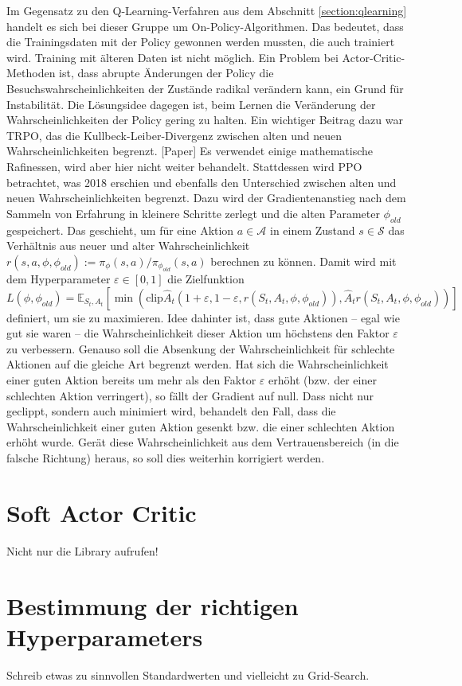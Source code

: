 Im Gegensatz zu den Q-Learning-Verfahren aus dem Abschnitt \ref{section:qlearning} handelt es sich bei dieser Gruppe um On-Policy-Algorithmen.
Das bedeutet, dass die Trainingsdaten mit der Policy gewonnen werden mussten, die auch trainiert wird.
Training mit älteren Daten ist nicht möglich.
Ein Problem bei Actor-Critic-Methoden ist, dass abrupte Änderungen der Policy die Besuchswahrscheinlichkeiten der Zustände radikal verändern kann, ein Grund für Instabilität.
Die Lösungsidee dagegen ist, beim Lernen die Veränderung der Wahrscheinlichkeiten der Policy gering zu halten.
Ein wichtiger Beitrag dazu war TRPO, das die Kullbeck-Leiber-Divergenz zwischen alten und neuen Wahrscheinlichkeiten begrenzt. [Paper]
Es verwendet einige mathematische Rafinessen, wird aber hier nicht weiter behandelt.
Stattdessen wird PPO betrachtet, was 2018 erschien und ebenfalls den Unterschied zwischen alten und neuen Wahrscheinlichkeiten begrenzt.
Dazu wird der Gradientenanstieg nach dem Sammeln von Erfahrung in kleinere Schritte zerlegt und die alten Parameter $\phi_{old}$ gespeichert.
Das geschieht, um für eine Aktion $a \in \mathcal{A}$ in einem Zustand $s \in \mathcal{S}$ das Verhältnis aus neuer und alter Wahrscheinlichkeit $r(s, a, \phi, \phi_{old}) := \pi_\phi(s, a) / \pi_{\phi_{old}}(s, a)$ berechnen zu können.
Damit wird mit dem Hyperparameter $\varepsilon \in [0,1]$ die Zielfunktion
\begin{equation}
    L(\phi, \phi_{old}) = \mathbb{E}_{S_t, A_t}\left[\min{\left(\text{clip}{\hat{A}_t \left(1 + \varepsilon, 1 - \varepsilon, r(S_t, A_t, \phi, \phi_{old})\right)}, \hat{A}_t r(S_t, A_t, \phi, \phi_{old})\right)}\right]
\end{equation}
definiert, um sie zu maximieren.
Idee dahinter ist, dass gute Aktionen -- egal wie gut sie waren -- die Wahrscheinlichkeit dieser Aktion um höchstens den Faktor $\varepsilon$ zu verbessern.
Genauso soll die Absenkung der Wahrscheinlichkeit für schlechte Aktionen auf die gleiche Art begrenzt werden.
Hat sich die Wahrscheinlichkeit einer guten Aktion bereits um mehr als den Faktor $\varepsilon$ erhöht (bzw. der einer schlechten Aktion verringert), so fällt der Gradient auf null.
Dass nicht nur geclippt, sondern auch minimiert wird, behandelt den Fall, dass die Wahrscheinlichkeit einer guten Aktion gesenkt bzw. die einer schlechten Aktion erhöht wurde.
Gerät diese Wahrscheinlichkeit aus dem Vertrauensbereich (in die falsche Richtung) heraus, so soll dies weiterhin korrigiert werden.

\section{Soft Actor Critic}
Nicht nur die Library aufrufen!

\section{Bestimmung der richtigen Hyperparameters}
Schreib etwas zu sinnvollen Standardwerten und vielleicht zu Grid-Search.

